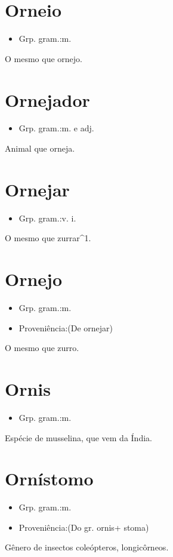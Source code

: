 \section{Orneio}
\begin{itemize}
\item {Grp. gram.:m.}
\end{itemize}
O mesmo que \textunderscore ornejo\textunderscore .
\section{Ornejador}
\begin{itemize}
\item {Grp. gram.:m.  e  adj.}
\end{itemize}
Animal que orneja.
\section{Ornejar}
\begin{itemize}
\item {Grp. gram.:v. i.}
\end{itemize}
O mesmo que \textunderscore zurrar\textunderscore ^1.
\section{Ornejo}
\begin{itemize}
\item {Grp. gram.:m.}
\end{itemize}
\begin{itemize}
\item {Proveniência:(De \textunderscore ornejar\textunderscore )}
\end{itemize}
O mesmo que \textunderscore zurro\textunderscore .
\section{Ornis}
\begin{itemize}
\item {Grp. gram.:m.}
\end{itemize}
Espécie de musselina, que vem da Índia.
\section{Ornístomo}
\begin{itemize}
\item {Grp. gram.:m.}
\end{itemize}
\begin{itemize}
\item {Proveniência:(Do gr. \textunderscore ornis\textunderscore  + \textunderscore stoma\textunderscore )}
\end{itemize}
Gênero de insectos coleópteros, longicôrneos.
